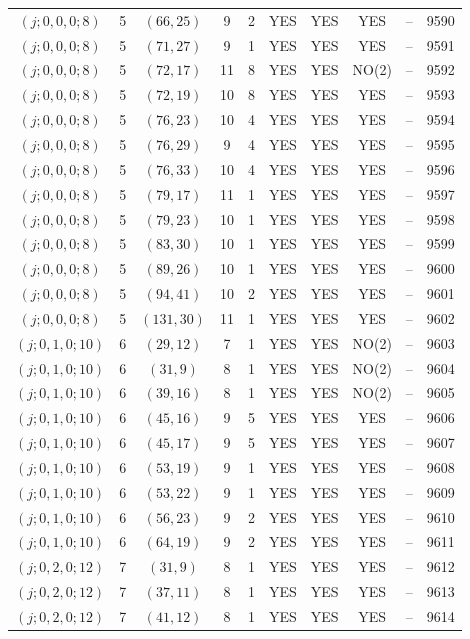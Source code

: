 \begin{longtable}{|c|c|c|c|c|c|c|c|c|c|}
$(j; 0, 0, 0; 8)$ & 5 & $(66, 25)$ & 9 & 2 & YES & YES & YES & -- & 9590\\
$(j; 0, 0, 0; 8)$ & 5 & $(71, 27)$ & 9 & 1 & YES & YES & YES & -- & 9591\\
$(j; 0, 0, 0; 8)$ & 5 & $(72, 17)$ & 11 & 8 & YES & YES & NO(2) & -- & 9592\\
$(j; 0, 0, 0; 8)$ & 5 & $(72, 19)$ & 10 & 8 & YES & YES & YES & -- & 9593\\
$(j; 0, 0, 0; 8)$ & 5 & $(76, 23)$ & 10 & 4 & YES & YES & YES & -- & 9594\\
$(j; 0, 0, 0; 8)$ & 5 & $(76, 29)$ & 9 & 4 & YES & YES & YES & -- & 9595\\
$(j; 0, 0, 0; 8)$ & 5 & $(76, 33)$ & 10 & 4 & YES & YES & YES & -- & 9596\\
$(j; 0, 0, 0; 8)$ & 5 & $(79, 17)$ & 11 & 1 & YES & YES & YES & -- & 9597\\
$(j; 0, 0, 0; 8)$ & 5 & $(79, 23)$ & 10 & 1 & YES & YES & YES & -- & 9598\\
$(j; 0, 0, 0; 8)$ & 5 & $(83, 30)$ & 10 & 1 & YES & YES & YES & -- & 9599\\
$(j; 0, 0, 0; 8)$ & 5 & $(89, 26)$ & 10 & 1 & YES & YES & YES & -- & 9600\\
$(j; 0, 0, 0; 8)$ & 5 & $(94, 41)$ & 10 & 2 & YES & YES & YES & -- & 9601\\
$(j; 0, 0, 0; 8)$ & 5 & $(131, 30)$ & 11 & 1 & YES & YES & YES & -- & 9602\\
$(j; 0, 1, 0; 10)$ & 6 & $(29, 12)$ & 7 & 1 & YES & YES & NO(2) & -- & 9603\\
$(j; 0, 1, 0; 10)$ & 6 & $(31, 9)$ & 8 & 1 & YES & YES & NO(2) & -- & 9604\\
$(j; 0, 1, 0; 10)$ & 6 & $(39, 16)$ & 8 & 1 & YES & YES & NO(2) & -- & 9605\\
$(j; 0, 1, 0; 10)$ & 6 & $(45, 16)$ & 9 & 5 & YES & YES & YES & -- & 9606\\
$(j; 0, 1, 0; 10)$ & 6 & $(45, 17)$ & 9 & 5 & YES & YES & YES & -- & 9607\\
$(j; 0, 1, 0; 10)$ & 6 & $(53, 19)$ & 9 & 1 & YES & YES & YES & -- & 9608\\
$(j; 0, 1, 0; 10)$ & 6 & $(53, 22)$ & 9 & 1 & YES & YES & YES & -- & 9609\\
$(j; 0, 1, 0; 10)$ & 6 & $(56, 23)$ & 9 & 2 & YES & YES & YES & -- & 9610\\
$(j; 0, 1, 0; 10)$ & 6 & $(64, 19)$ & 9 & 2 & YES & YES & YES & -- & 9611\\
$(j; 0, 2, 0; 12)$ & 7 & $(31, 9)$ & 8 & 1 & YES & YES & YES & -- & 9612\\
$(j; 0, 2, 0; 12)$ & 7 & $(37, 11)$ & 8 & 1 & YES & YES & YES & -- & 9613\\
$(j; 0, 2, 0; 12)$ & 7 & $(41, 12)$ & 8 & 1 & YES & YES & YES & -- & 9614
\end{longtable}
